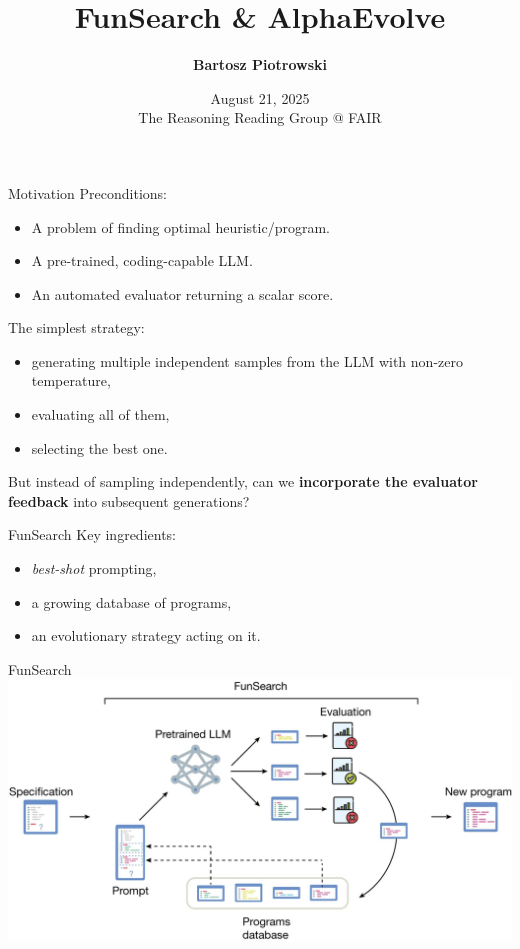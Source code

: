 \documentclass{beamer}
\title{\textbf{FunSearch \& AlphaEvolve}}
\author{
\textbf{
Bartosz Piotrowski
}}
\date{
August 21, 2025\\
The Reasoning Reading Group @ FAIR
}
\begin{document}
\begin{frame}
  \titlepage
\end{frame}

\begin{frame}{Motivation}
Preconditions:
\begin{itemize}
\item A problem of finding optimal heuristic/program.
\item A pre-trained, coding-capable LLM.
\item An automated evaluator returning a scalar score.
\end{itemize}
\pause
The simplest strategy:
\begin{itemize}
\item generating multiple independent samples from the LLM with non-zero
 temperature,
\item evaluating all of them,
\item selecting the best one.
\end{itemize}

\pause
But instead of sampling independently, can we \textbf{incorporate the evaluator
feedback} into subsequent generations?

\end{frame}

\begin{frame}{FunSearch}
Key ingredients:
\begin{itemize}
\item \textit{best-shot} prompting,
\item a growing database of programs,
\item an evolutionary strategy acting on it.
\end{itemize}
\end{frame}

\begin{frame}{FunSearch}
\includegraphics[width=\linewidth]{figures/funsearch-overview.png}
\end{frame}
\end{document}
